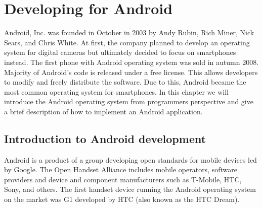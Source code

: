 








\chapter{Developing for Android}

Android, Inc\@. was founded in October in 2003 by Andy Rubin, Rich Miner, Nick Sears, and Chris White. 
At first, the company planned to develop an operating system for digital cameras %
but ultimately %
decided to focus on smartphones instead. %
The first phone with Android operating system was sold in autumn 2008.
Majority of Android's code is released under a free license. 
This allows developers to modify and freely distribute the software.
Due to this, Android became the most common operating system for smartphones.
In this chapter we will introduce the Android operating system from programmers perspective and give a brief description of how to implement an Android application.

\section{Introduction to Android development}

Android is a product of a group developing open standards for mobile devices led by Google.
The Open Handset Alliance includes mobile operators, software providers and device and component manufacturers such as
T-Mobile, HTC, Sony, and others.
The first handset device running the Android operating system on the market was G1 developed by HTC (also known as the HTC Dream). 

